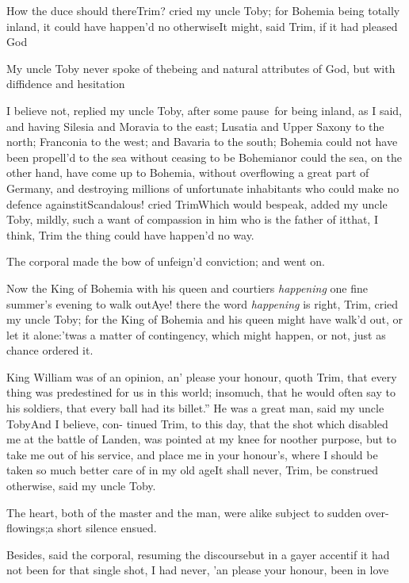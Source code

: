 \documentclass{article}
\begin{document}
How the duce should there\tsk Trim? cried my
uncle Toby; for Bohemia being totally inland, it
could have happen’d no otherwise\tsh It might, said
Trim, if it had pleased God\tsh

My uncle Toby never spoke of the\break being and natural
attributes of God, but with diffidence and
hesitation\tsh{}

\tsk I believe not, replied my uncle Toby, after
some pause\tsk\ for being inland, as I said, and having
Silesia and Moravia to the east; Lusatia and
Upper Saxony to the north; Franconia to the
west; and Bavaria to the south; Bohemia could not
have been propell’d to the sea without ceasing to be
Bohemia\tsh nor could the sea, on the other hand,
have come up to Bohemia, without overflowing a great part of
Germany, and destroying millions of unfortunate inhabitants
who could make no defence against\break it\tsh Scandalous! cried
Trim\tsk Which would bespeak, added my uncle Toby,
mildly, such a want of compassion in him who is the father of
it\tsh that, I think, Trim \tsh the thing
could have happen’d no way.

The corporal made the bow of unfeign’d conviction; and
went on.

Now the King of Bohemia with his queen and courtiers
\textit{happening} one fine summer’s evening to walk
out\tsh Aye! there the word \textit{happening} is right,
Trim, cried my uncle Toby; for the King of
Bohemia and his queen might have walk’d out, or let it
alone:\tsh ’twas a matter of contingency, which
might happen, or not, just as chance ordered it.

King William was of an opinion, an’ please your
honour, quoth Trim, that every thing was predestined for us
in this world; insomuch, that he would often say to his soldiers,
that \lqq every ball had its billet.” He was a great man,
said my uncle Toby\tsh And I believe, con- tinued
Trim, to this day, that the shot which disabled me at the
battle of Landen, was pointed at my knee for no\break other
purpose, but to take me out of his service, and place me in your
honour’s, where I should be taken so much better care of in
my old age\tsh It shall never, Trim, be construed
otherwise, said my uncle Toby.

The heart, both of the master and the man, were alike subject to
sudden over-flowings;\tsh a short silence ensued.

Besides, said the corporal, resuming the discourse\tsk but in
a gayer accent\tsh if it had not been for that single
shot, I had never, ’an please your honour, been in
love\tsh{}
\end{document}

